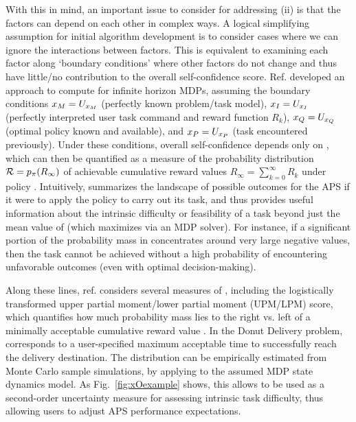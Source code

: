 With this in mind, an important issue to consider for addressing (ii) is that the factors can depend on each other in complex ways. A logical simplifying assumption for initial algorithm development is to consider cases where we can ignore the interactions between factors. This is equivalent to examining each factor along `boundary conditions' where other factors do not change and thus have little/no contribution to the overall self-confidence score. 
Ref. \cite{Aitken2016-cv} developed an approach to compute \xO{} for infinite horizon MDPs, assuming the boundary conditions $x_M=U_{x_M}$ (perfectly known problem/task model), $x_I=U_{x_I}$ (perfectly interpreted user task command and reward function $R_k$), $x_Q=U_{x_Q}$ (optimal policy \policyopt{} known and available), and $x_P=U_{x_P}$ (task encountered previously). Under these conditions, overall self-confidence depends only on \xO{}, which can then be quantified as a measure of the probability distribution $\mathcal{R} = p_{\pi}(R_{\infty})$ of achievable cumulative reward values $R_{\infty} = \sum_{k=0}^{\infty}R_{k}$ under policy \policy. Intuitively, \rwd{} summarizes the landscape of possible outcomes for the APS if it were to apply the policy \policy{} to carry out its task, and thus provides useful information about the intrinsic difficulty or feasibility of a task beyond just the mean value of \rwd{} (which \policy{} maximizes via an MDP solver). For instance, if a significant portion of the probability mass in \rwd{} concentrates around very large negative values, then the task cannot be achieved without a high probability of encountering unfavorable outcomes (even with optimal decision-making). 

Along these lines, ref. \cite{Aitken2016-cv} considers several measures of \rwd, including the logistically transformed upper partial moment/lower partial moment (UPM/LPM) score, which quantifies how much probability mass lies to the right vs. left of a minimally acceptable cumulative reward value \riref. In the Donut Delivery problem, \riref{} corresponds to a user-specified maximum acceptable time to successfully reach the delivery destination. The distribution \rwd{} can be empirically estimated from Monte Carlo sample simulations, by applying \policy{} to the assumed MDP state dynamics model. 
As  Fig.~\ref{fig:xOexample} shows, this allows \xO{} to be used as a second-order uncertainty measure for assessing intrinsic task difficulty, thus allowing users to adjust APS performance expectations. %

